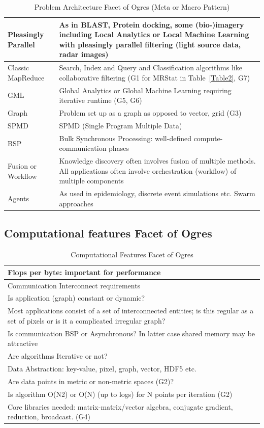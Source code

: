 \documentclass{acm_proc_article-sp}
\begin{document}
\begin{table}[t]
\centering
\caption{Problem Architecture Facet of Ogres (Meta or Macro Pattern)}
\label{Table6}
\begin{tabular}{|p{1.5cm}|p{5.75cm}|} \hline
Pleasingly Parallel & As in BLAST, Protein docking, some (bio-)imagery  including Local Analytics or Local Machine Learning with pleasingly parallel filtering (light source data, radar images) \\ \hline
Classic MapReduce & Search, Index and Query and Classification algorithms like collaborative filtering (G1 for MRStat in Table~\ref{Table2}, G7) \\ \hline
GML & Global Analytics or Global Machine Learning requiring iterative runtime (G5, G6) \\ \hline
Graph & Problem set up as a graph as opposed to vector, grid (G3) \\ \hline
SPMD & SPMD (Single Program Multiple Data) \\ \hline
BSP & Bulk Synchronous Processing: well-defined compute-communication phases \\ \hline
Fusion or Workflow & Knowledge discovery often involves fusion of multiple methods. All applications often involve orchestration (workflow) of multiple components \\ \hline
Agents & As used in epidemiology, discrete event simulations etc. Swarm approaches
\\ \hline
\end{tabular}
\end{table}


\subsection{Computational features Facet of Ogres}
\begin{table}
\centering
\caption{ Computational Features Facet of Ogres}
\label{Table7}
\begin{tabular}{|p{10cm}|} \hline
Flops per byte: important for performance \\ \hline
Communication Interconnect requirements \\ \hline
Is application (graph) constant or dynamic? \\ \hline
Most applications consist of a set of interconnected entities; is this regular as a set of pixels or is it a complicated irregular graph? \\ \hline
Is communication BSP or Asynchronous? In latter case shared memory may be attractive\\ \hline
Are algorithms Iterative or not?\\ \hline
Data Abstraction: key-value, pixel, graph, vector, HDF5 etc.\\ \hline
Are data points in metric or non-metric spaces (G2)? \\ \hline
Is algorithm O(N2) or O(N) (up to logs) for N points per iteration (G2)\\ \hline
Core libraries needed: matrix-matrix/vector algebra, conjugate gradient, reduction, broadcast. (G4)
\\ \hline
\end{tabular}
\end{table}
\end{document}
